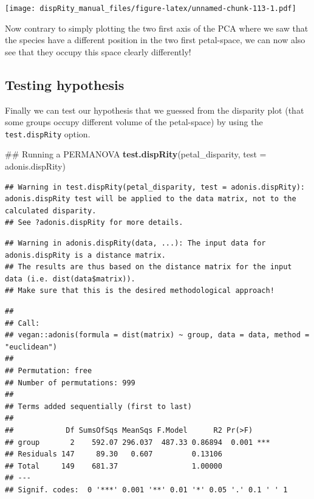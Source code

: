 \documentclass[]{book}
\newenvironment{Shaded}{\begin{snugshade}}{\end{snugshade}}
\newcommand{\KeywordTok}[1]{\textcolor[rgb]{0.13,0.29,0.53}{\textbf{#1}}}
\newcommand{\DataTypeTok}[1]{\textcolor[rgb]{0.13,0.29,0.53}{#1}}
\newcommand{\NormalTok}[1]{#1}
\theoremstyle{definition}
\theoremstyle{definition}
\theoremstyle{remark}
\begin{document}
\texttt{[image: dispRity\_manual\_files/figure-latex/unnamed-chunk-113-1.pdf]}

Now contrary to simply plotting the two first axis of the PCA where we
saw that the species have a different position in the two first
petal-space, we can now also see that they occupy this space clearly
differently!

\subsection{Testing hypothesis}\label{testing-hypothesis}

Finally we can test our hypothesis that we guessed from the disparity
plot (that some groups occupy different volume of the petal-space) by
using the \texttt{test.dispRity} option.

\begin{Shaded}
\begin{Highlighting}[]
\NormalTok{## Running a PERMANOVA}
\KeywordTok{test.dispRity}\NormalTok{(petal_disparity, }\DataTypeTok{test =}\NormalTok{ adonis.dispRity)}
\end{Highlighting}
\end{Shaded}

\begin{verbatim}
## Warning in test.dispRity(petal_disparity, test = adonis.dispRity): adonis.dispRity test will be applied to the data matrix, not to the calculated disparity.
## See ?adonis.dispRity for more details.
\end{verbatim}

\begin{verbatim}
## Warning in adonis.dispRity(data, ...): The input data for adonis.dispRity is a distance matrix.
## The results are thus based on the distance matrix for the input data (i.e. dist(data$matrix)).
## Make sure that this is the desired methodological approach!
\end{verbatim}

\begin{verbatim}
## 
## Call:
## vegan::adonis(formula = dist(matrix) ~ group, data = data, method = "euclidean") 
## 
## Permutation: free
## Number of permutations: 999
## 
## Terms added sequentially (first to last)
## 
##            Df SumsOfSqs MeanSqs F.Model      R2 Pr(>F)    
## group       2    592.07 296.037  487.33 0.86894  0.001 ***
## Residuals 147     89.30   0.607         0.13106           
## Total     149    681.37                 1.00000           
## ---
## Signif. codes:  0 '***' 0.001 '**' 0.01 '*' 0.05 '.' 0.1 ' ' 1
\end{verbatim}
\end{document}
